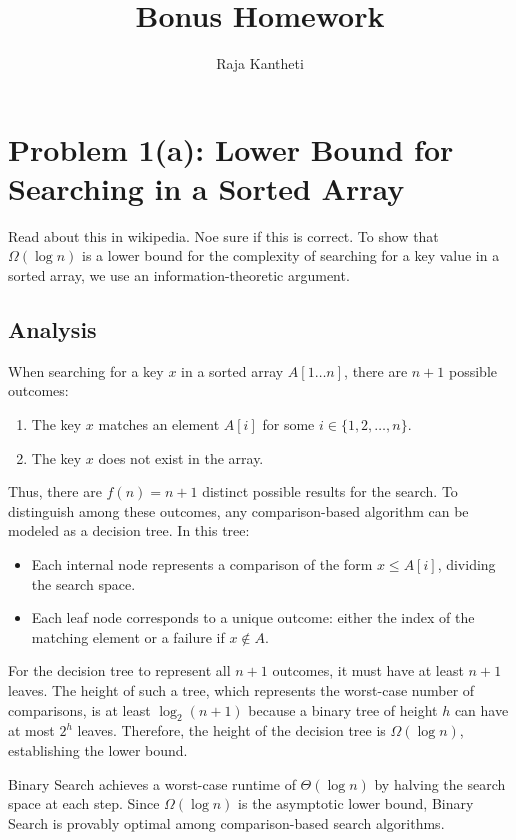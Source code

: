 \documentclass[12pt]{article}
\title{Bonus Homework}
\author{Raja Kantheti}
\date{}
\begin{document}
\maketitle

\section*{Problem 1(a): Lower Bound for Searching in a Sorted Array}
Read about this in wikipedia. Noe sure if this is correct. 
To show that \(\Omega(\log n)\) is a lower bound for the complexity of searching for a key value in a sorted array, we use an information-theoretic argument.

\subsection*{Analysis}
When searching for a key \(x\) in a sorted array \(A[1 \dots n]\), there are \(n + 1\) possible outcomes:
\begin{enumerate}
    \item The key \(x\) matches an element \(A[i]\) for some \(i \in \{1, 2, \dots, n\}\).
    \item The key \(x\) does not exist in the array.
\end{enumerate}
Thus, there are \(f(n) = n + 1\) distinct possible results for the search. To distinguish among these outcomes, any comparison-based algorithm can be modeled as a decision tree. In this tree:
\begin{itemize}
    \item Each internal node represents a comparison of the form \(x \leq A[i]\), dividing the search space.
    \item Each leaf node corresponds to a unique outcome: either the index of the matching element or a failure if \(x \notin A\).
\end{itemize}

For the decision tree to represent all \(n + 1\) outcomes, it must have at least \(n + 1\) leaves. The height of such a tree, which represents the worst-case number of comparisons, is at least \(\log_2(n + 1)\) because a binary tree of height \(h\) can have at most \(2^h\) leaves. Therefore, the height of the decision tree is \(\Omega(\log n)\), establishing the lower bound.

Binary Search achieves a worst-case runtime of \(\Theta(\log n)\) by halving the search space at each step. Since \(\Omega(\log n)\) is the asymptotic lower bound, Binary Search is provably optimal among comparison-based search algorithms.
\end{document}
